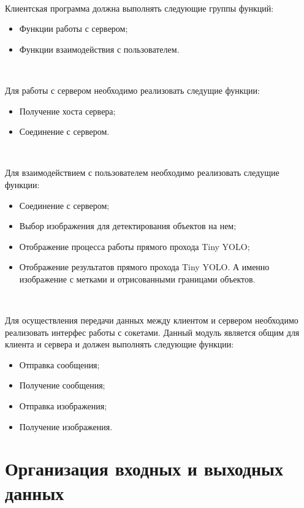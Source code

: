 \documentclass[a4paper,english]{G2-105}
\begin{document}
~\ 
\par Клиентская программа должна выполнять следующие группы функций:
\begin{itemize}
\item Функции работы с сервером;
\item Функции взаимодействия с пользователем.
\end{itemize}
~\ 
\par Для работы с сервером необходимо реализовать следущие функции:
\begin{itemize}
\item Получение хоста сервера;
\item Соединение с сервером.
\end{itemize}
~\ 
\par Для взаимодействием с пользователем необходимо реализовать следущие функции:
\begin{itemize}
\item Соединение с сервером;
\item Выбор изображения для детектирования объектов на нем;
\item Отображение процесса работы прямого прохода Tiny YOLO;
\item Отображение результатов прямого прохода Tiny YOLO. А именно изображение с метками и отрисованными границами объектов.
\end{itemize}
~\ 
\par Для осуществления передачи данных между клиентом и сервером необходимо реализовать интерфес работы с сокетами. Данный модуль является общим для клиента и сервера и должен выполнять следующие функции:
\begin{itemize}
\item Отправка сообщения;
\item Получение сообщения;
\item Отправка изображения;
\item Получение изображения.
\end{itemize} 

\section{Организация входных и выходных данных}
\end{document}
